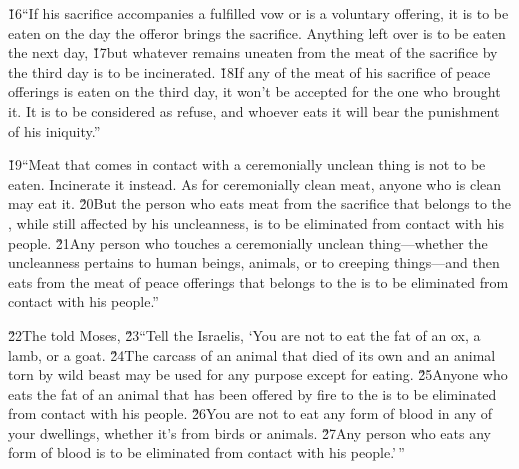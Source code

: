 \v{16}``If his sacrifice accompanies a fulfilled vow or is a voluntary offering, it is to be eaten on the day the offeror brings the sacrifice. Anything left over is to be eaten the next day, \v{17}but whatever remains uneaten from the meat of the sacrifice by the third day is to be incinerated. \v{18}If any of the meat of his sacrifice of peace offerings is eaten on the third day, it won't be accepted for the one who brought it. It is to be considered as refuse, and whoever eats it will bear the punishment of his iniquity.''

\v{19}``Meat that comes in contact with a ceremonially unclean thing is not to be eaten. Incinerate it instead. As for ceremonially clean meat, anyone who is clean may eat it. \v{20}But the person who eats meat from the sacrifice that belongs to the , while still affected by his uncleanness, is to be eliminated from contact with his people. \v{21}Any person who touches a ceremonially unclean thing---whether the uncleanness pertains to human beings, animals, or to creeping things---and then eats from the meat of peace offerings that belongs to the  is to be eliminated from contact with his people.''

\v{22}The  told Moses, \v{23}``Tell the Israelis, `You are not to eat the fat of an ox, a lamb, or a goat. \v{24}The carcass of an animal that died of its own and an animal torn by wild beast may be used for any purpose except for eating. \v{25}Anyone who eats the fat of an animal that has been offered by fire to the  is to be eliminated from contact with his people. \v{26}You are not to eat any form of blood in any of your dwellings, whether it's from birds or animals. \v{27}Any person who eats any form of blood is to be eliminated from contact with his people.'\,''

